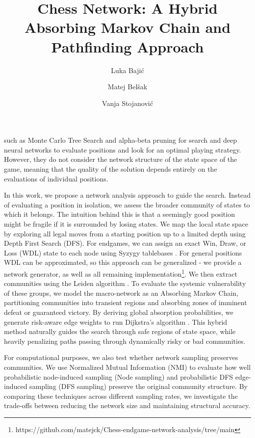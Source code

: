 \documentclass[9pt,twocolumn,twoside]{pnas-report}
\title{Chess Network: A Hybrid Absorbing Markov Chain and Pathfinding Approach}
\author[a]{Luka Bajić}
\author[a]{Matej Belšak}
\author[b]{Vanja Stojanović}
\affil[a]{University of Ljubljana, Faculty of Computer and Information Science, Ve\v{c}na pot 113, SI-1000 Ljubljana, Slovenia}
\affil[b]{University of Ljubljana, Faculty of Mathematics and Physics, Jadranska cesta 21, SI-1000 Ljubljana, Slovenia}
\begin{document}
\maketitle
\thispagestyle{firststyle}

 such as Monte Carlo Tree Search \cite{mcts} and alpha-beta pruning \cite{alphabeta} for search and deep neural networks to evaluate positions and look for an optimal playing strategy. However, they do not consider the network structure of the state space of the game, meaning that the quality of the solution depends entirely on the evaluations of individual positions.

In this work, we propose a network analysis approach to guide the search. Instead of evaluating a position in isolation, we assess the broader community of states to which it belongs. The intuition behind this is that a seemingly good position might be fragile if it is surrounded by losing states. We map the local state space by exploring all legal moves from a starting position up to a limited depth using Depth First Search (DFS). For endgames, we can assign an exact Win, Draw, or Loss (WDL) state to each node using Syzygy tablebases \cite{syzygy}. For general positions WDL can be approximated, so this approach can be generalized - we provide a network generator, as well as all remaining implementation\footnote{https://github.com/matejck/Chess-endgame-network-analysis/tree/main}. We then extract communities using the Leiden algorithm \cite{leiden}. To evaluate the systemic vulnerability of these groups, we model the macro-network as an Absorbing Markov Chain, partitioning communities into transient regions and absorbing zones of imminent defeat or guaranteed victory. By deriving global absorption probabilities, we generate risk-aware edge weights to run Dijkstra's algorithm \cite{dijkstra}. This hybrid method naturally guides the search through safe regions of state space, while heavily penalizing paths passing through dynamically risky or bad communities.

For computational purposes, we also test whether network sampling preserves communities. We use Normalized Mutual Information (NMI) to evaluate how well probabilistic node-induced sampling (Node sampling) and probabilistic DFS edge-induced sampling (DFS sampling) preserve the original community structure. By comparing these techniques across different sampling rates, we investigate the trade-offs between reducing the network size and maintaining structural accuracy.
\end{document}
